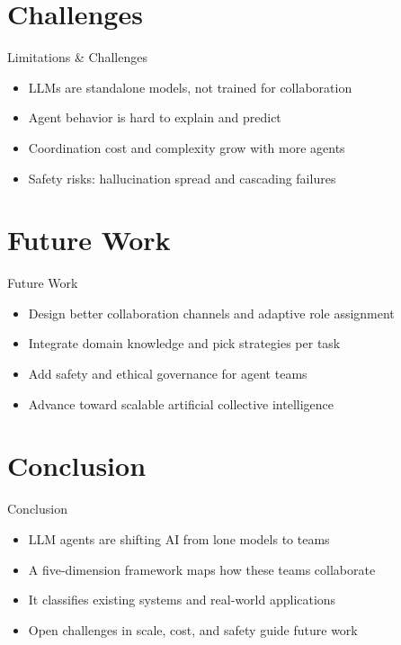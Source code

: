 \documentclass[10pt]{beamer}
\begin{document}
\section{Challenges}
\begin{frame}{Limitations \& Challenges}
\begin{itemize}
  \item LLMs are standalone models, not trained for collaboration
  \item Agent behavior is hard to explain and predict
  \item Coordination cost and complexity grow with more agents
  \item Safety risks: hallucination spread and cascading failures
\end{itemize}
\end{frame}

\section{Future Work}
\begin{frame}{Future Work}
\begin{itemize}
  \item Design better collaboration channels and adaptive role assignment
  \item Integrate domain knowledge and pick strategies per task
  \item Add safety and ethical governance for agent teams
  \item Advance toward scalable artificial collective intelligence
\end{itemize}
\end{frame}

\section{Conclusion}
\begin{frame}{Conclusion}
\begin{itemize}
  \item LLM agents are shifting AI from lone models to teams
  \item A five-dimension framework maps how these teams collaborate
  \item It classifies existing systems and real-world applications
  \item Open challenges in scale, cost, and safety guide future work
\end{itemize}
\end{frame}
\end{document}
